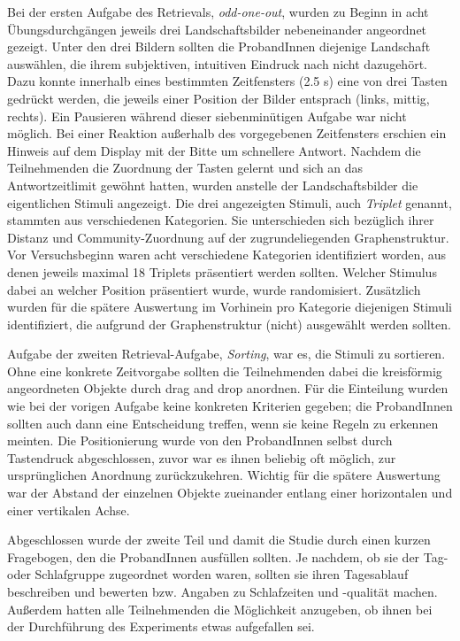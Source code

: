 Bei der ersten Aufgabe des Retrievals, \textit{odd-one-out}, wurden zu Beginn in acht Übungsdurchgängen jeweils drei Landschaftsbilder nebeneinander angeordnet gezeigt. Unter den drei Bildern sollten die ProbandInnen diejenige Landschaft auswählen, die ihrem subjektiven, intuitiven Eindruck nach nicht dazugehört. Dazu konnte innerhalb eines bestimmten Zeitfensters (2.5 s) eine von drei Tasten gedrückt werden, die jeweils einer Position der Bilder entsprach (links, mittig, rechts). Ein Pausieren während dieser siebenminütigen Aufgabe war nicht möglich. Bei einer Reaktion außerhalb des vorgegebenen Zeitfensters erschien ein Hinweis auf dem Display mit der Bitte um schnellere Antwort. Nachdem die Teilnehmenden die Zuordnung der Tasten gelernt und sich an das Antwortzeitlimit gewöhnt hatten, wurden anstelle der Landschaftsbilder die eigentlichen Stimuli angezeigt. Die drei angezeigten Stimuli, auch \textit{Triplet} genannt, stammten aus verschiedenen Kategorien. Sie unterschieden sich bezüglich ihrer Distanz und Community-Zuordnung auf der zugrundeliegenden Graphenstruktur. Vor Versuchsbeginn waren acht verschiedene Kategorien identifiziert worden, aus denen jeweils maximal 18 Triplets präsentiert werden sollten. Welcher Stimulus dabei an welcher Position präsentiert wurde, wurde randomisiert. Zusätzlich wurden für die spätere Auswertung im Vorhinein pro Kategorie diejenigen Stimuli identifiziert, die aufgrund der Graphenstruktur (nicht) ausgewählt werden sollten.

Aufgabe der zweiten Retrieval-Aufgabe, \textit{Sorting}, war es, die Stimuli zu sortieren. Ohne eine konkrete Zeitvorgabe sollten die Teilnehmenden dabei die kreisförmig angeordneten Objekte durch drag and drop anordnen. Für die Einteilung wurden wie bei der vorigen Aufgabe keine konkreten Kriterien gegeben; die ProbandInnen sollten auch dann eine Entscheidung treffen, wenn sie keine Regeln zu erkennen meinten. Die Positionierung wurde von den ProbandInnen selbst durch Tastendruck abgeschlossen, zuvor war es ihnen beliebig oft möglich, zur ursprünglichen Anordnung zurückzukehren. Wichtig für die spätere Auswertung war der Abstand der einzelnen Objekte zueinander entlang einer horizontalen und einer vertikalen Achse.

Abgeschlossen wurde der zweite Teil und damit die Studie durch einen kurzen Fragebogen, den die ProbandInnen ausfüllen sollten. Je nachdem, ob sie der Tag- oder Schlafgruppe zugeordnet worden waren, sollten sie ihren Tagesablauf beschreiben und bewerten bzw. Angaben zu Schlafzeiten und -qualität machen. Außerdem hatten alle Teilnehmenden die Möglichkeit anzugeben, ob ihnen bei der Durchführung des Experiments etwas aufgefallen sei.


